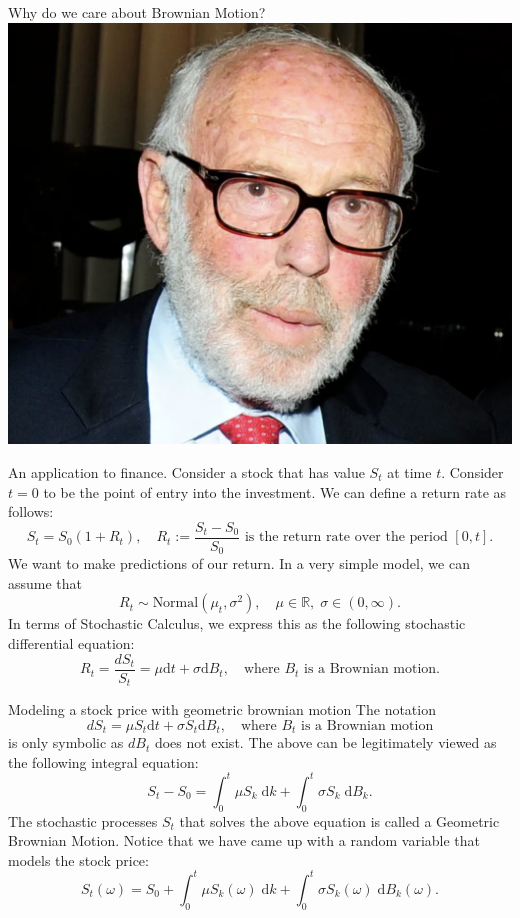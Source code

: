 \documentclass{beamer}%
\numberwithin{equation}{section}
\newcommand{\R}{\mathbb{R}}
\newcommand{\ud}{\ensuremath{\mathrm{d} }}
\begin{document}
	\begin{frame}{Why do we care about Brownian Motion?}
		\centering
		\includegraphics[scale=.3]{simmons.png}
	\end{frame}
	
	\begin{frame}{An application to finance.}
		Consider a stock that has value $S_t$ at time $t$. Consider $t=0$ to be the point of entry into the investment. We can define a return rate as follows:
		\[
		S_t = S_0(1 + R_t ), \quad R_t := \frac{S_t - S_0}{S_0} \text{ is the return rate over the period $[0,t]$} .
		\]
		We want to make predictions of our return. In a very simple model, we can assume that 
		\[
		R_t \sim \text{Normal}(\mu_t, \sigma^2), \quad \mu \in \R,\; \sigma \in (0,\infty).
		\]
		In terms of Stochastic Calculus, we express this as the following stochastic differential equation:
		\[
		R_t =	\frac{dS_t}{S_t} = \mu \ud t + \sigma \ud B_t, \quad \text{where } B_t \text{ is a Brownian motion.}
		\]
		
	\end{frame}
	
	\begin{frame}{Modeling a stock price with geometric brownian motion}
		The notation 
		\[
		dS_t = \mu S_t \ud t + \sigma S_t \ud B_t, \quad \text{where } B_t \text{ is a Brownian motion}
		\]
		is only symbolic as $dB_t$ does not exist. The above can be legitimately viewed as the following integral equation:
		\[
		S_t - S_0 = \int_0^t \mu S_k \; \ud k + \int_0^t \sigma S_k \; \ud B_k.
		\] 		
		The stochastic processes $S_t$ that solves the above equation is called a Geometric Brownian Motion. 	Notice that we have came up with a random variable that models the stock price:
		\[
		S_t(\omega)  = S_0 +  \int_0^t \mu S_k(\omega) \; \ud k + \int_0^t \sigma S_k(\omega) \; \ud B_k(\omega).
		\]
	\end{frame}
	
\end{document}
